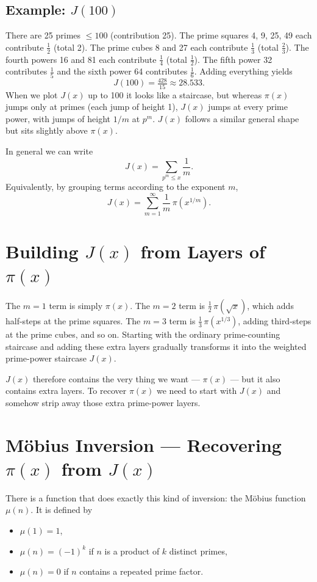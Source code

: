 \documentclass[11pt]{article}
\begin{document}
\subsection*{Example: $J(100)$}

There are 25 primes $\le 100$ (contribution 25). The prime squares 4, 9, 25, 49 each contribute $\tfrac{1}{2}$ (total 2). The prime cubes 8 and 27 each contribute $\tfrac{1}{3}$ (total $\tfrac{2}{3}$). The fourth powers 16 and 81 each contribute $\tfrac{1}{4}$ (total $\tfrac{1}{2}$). The fifth power 32 contributes $\tfrac{1}{5}$ and the sixth power 64 contributes $\tfrac{1}{6}$. Adding everything yields
\[
J(100) = \tfrac{428}{15} \approx 28.533.
\]
When we plot $J(x)$ up to 100 it looks like a staircase, but whereas $\pi(x)$ jumps only at primes (each jump of height 1), $J(x)$ jumps at every prime power, with jumps of height $1/m$ at $p^m$. $J(x)$ follows a similar general shape but sits slightly above $\pi(x)$.

In general we can write
\[
J(x) = \sum_{p^m \le x} \frac{1}{m}.
\]
Equivalently, by grouping terms according to the exponent $m$,
\[
J(x) = \sum_{m=1}^{\infty} \frac{1}{m}\, \pi\!\left(x^{1/m}\right).
\]

\section{Building $J(x)$ from Layers of $\pi(x)$}

The $m = 1$ term is simply $\pi(x)$. The $m = 2$ term is $\tfrac{1}{2}\,\pi(\sqrt{x})$, which adds half-steps at the prime squares. The $m = 3$ term is $\tfrac{1}{3}\,\pi(x^{1/3})$, adding third-steps at the prime cubes, and so on. Starting with the ordinary prime-counting staircase and adding these extra layers gradually transforms it into the weighted prime-power staircase $J(x)$.

$J(x)$ therefore contains the very thing we want --- $\pi(x)$ --- but it also contains extra layers. To recover $\pi(x)$ we need to start with $J(x)$ and somehow strip away those extra prime-power layers.

\section{M\"obius Inversion --- Recovering $\pi(x)$ from $J(x)$}

There is a function that does exactly this kind of inversion: the M\"obius function $\mu(n)$. It is defined by
\begin{itemize}[nosep]
\item $\mu(1) = 1$,
\item $\mu(n) = (-1)^k$ if $n$ is a product of $k$ distinct primes,
\item $\mu(n) = 0$ if $n$ contains a repeated prime factor.
\end{itemize}
\end{document}
